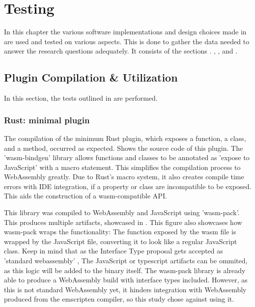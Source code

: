 \chapter{Testing}%
\label{chap:testing}

In this chapter the various software implementations and design choices made in  are used and tested on various aspects. 
This is done to gather the data needed to answer the research questions adequately.
It consists of the sections . , , and .


\section{Plugin Compilation \& Utilization}
\label{sec:testing:compilation}

In this section, the tests outlined in  are performed. 

\subsection{Rust: minimal plugin}

\graphicspath{{../../assets/images/6.1.1/}}

The compilation of the minimum Rust plugin, which exposes a function, a class, and a method, occurred as expected.   
 Shows the source code of this plugin. 
The 'wasm-bindgen' library allows functions and classes to be annotated as 'expose to JavaScript' with a macro statement. 
This simplifies the compilation process to WebAssembly greatly. 
Due to Rust's macro system, it also creates compile time errors with IDE integration, if a property or class are incompatible to be exposed. 
This aids the construction of a wasm-compatible API. 

This library was compiled to WebAssembly and JavaScript using 'wasm-pack'. 
This produces multiple artifacts, showcased in . 
This figure also showcases how wasm-pack wraps the functionality: 
The  function exposed by the wasm file is wrapped by the JavaScript file, converting it to look like a regular JavaScript class.
Keep in mind that as the Interface Type proposal gets accepted as 'standard webassembly' \citep*{wagner_interface_2022}, The JavaScript or typescript artifacts can be ommited, as this logic will be added to the  binary itself.
The wasm-pack library is already able to produce a WebAssembly build with interface types included. 
However, as this is not standard WebAssembly yet, it hinders integration with WebAssembly produced from the emscripten compiler, so this study chose against using it.

